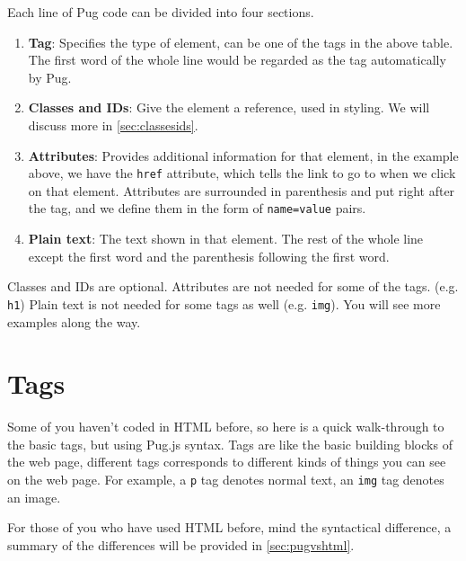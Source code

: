 Each line of Pug code can be divided into four sections.

\begin{enumerate}
    \item \textbf{Tag}: Specifies the type of element, can be one of the tags in the above table. The first word of the whole line would be regarded as the tag automatically by Pug.
    \item \textbf{Classes and IDs}: Give the element a reference, used in styling. We will discuss more in \cref{sec:classesids}.
    \item \textbf{Attributes}: Provides additional information for that element, in the example above, we have the \texttt{href} attribute, which tells the link to go to when we click on that element. Attributes are surrounded in parenthesis and put right after the tag, and we define them in the form of \texttt{name=value} pairs.
    \item \textbf{Plain text}: The text shown in that element. The rest of the whole line except the first word and the parenthesis following the first word.
\end{enumerate}

Classes and IDs are optional. Attributes are not needed for some of the tags. (e.g. \texttt{h1}) Plain text is not needed for some tags as well (e.g. \texttt{img}). You will see more examples along the way.

\section{Tags}

Some of you haven't coded in HTML before, so here is a quick walk-through to the basic tags, but using Pug.js syntax. Tags are like the basic building blocks of the web page, different tags corresponds to different kinds of things you can see on the web page. For example, a \texttt{p} tag denotes normal text, an \texttt{img} tag denotes an image. 
\vspace{6mm}

For those of you who have used HTML before, mind the syntactical difference, a summary of the differences will be provided in \cref{sec:pugvshtml}. 

\pagebreak

